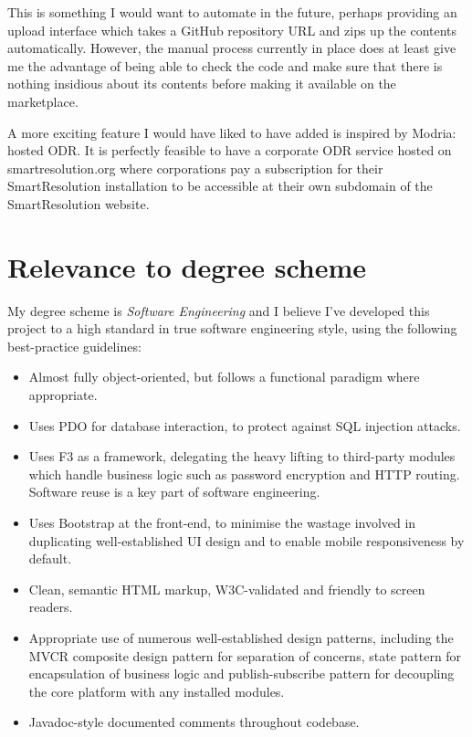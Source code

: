 This is something I would want to automate in the future, perhaps providing an upload interface which takes a GitHub repository URL and zips up the contents automatically. However, the manual process currently in place does at least give me the advantage of being able to check the code and make sure that there is nothing insidious about its contents before making it available on the marketplace.

A more exciting feature I would have liked to have added is inspired by Modria: hosted ODR. It is perfectly feasible to have a corporate ODR service hosted on smartresolution.org where corporations pay a subscription for their SmartResolution installation to be accessible at their own subdomain of the SmartResolution website.

\section{Relevance to degree scheme}

My degree scheme is \emph{Software Engineering} and I believe I've developed this project to a high standard in true software engineering style, using the following best-practice guidelines:

\begin{itemize}
\item Almost fully object-oriented, but follows a functional paradigm where appropriate.
\item Uses PDO for database interaction, to protect against SQL injection attacks.
\item Uses F3 as a framework, delegating the heavy lifting to third-party modules which handle business logic such as password encryption and HTTP routing. Software reuse is a key part of software engineering.
\item Uses Bootstrap at the front-end, to minimise the wastage involved in duplicating well-established UI design and to enable mobile responsiveness by default.
\item Clean, semantic HTML markup, W3C-validated and friendly to screen readers.
\item Appropriate use of numerous well-established design patterns, including the MVCR composite design pattern for separation of concerns, state pattern for encapsulation of business logic and publish-subscribe pattern for decoupling the core platform with any installed modules.
\item Javadoc-style documented comments throughout codebase.
\end{itemize}


